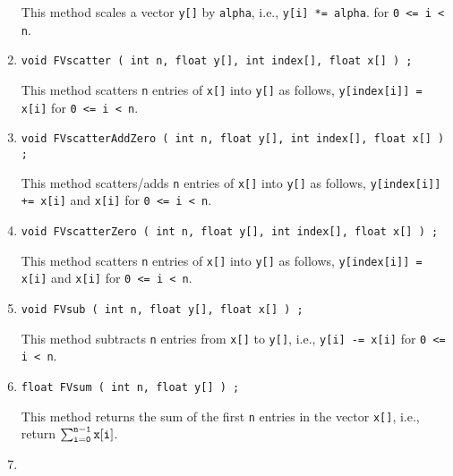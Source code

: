\begin{enumerate}
\begin{verbatim}
\end{verbatim}
This method scales a vector {\tt y[]} by {\tt alpha},
i.e.,
{\tt y[i] *= alpha}.
for {\tt 0 <= i < n}.
\item
\begin{verbatim}
void FVscatter ( int n, float y[], int index[], float x[] ) ;
\end{verbatim}
This method scatters {\tt n} entries of {\tt x[]} into {\tt y[]} 
as follows,
{\tt y[index[i]] = x[i]} 
for {\tt 0 <= i < n}.
\item
\begin{verbatim}
void FVscatterAddZero ( int n, float y[], int index[], float x[] ) ;
\end{verbatim}
This method scatters/adds {\tt n} entries of {\tt x[]} into {\tt y[]} 
as follows,
{\tt y[index[i]] += x[i]} and {\tt x[i]} 
for {\tt 0 <= i < n}.
\item
\begin{verbatim}
void FVscatterZero ( int n, float y[], int index[], float x[] ) ;
\end{verbatim}
This method scatters {\tt n} entries of {\tt x[]} into {\tt y[]} 
as follows,
{\tt y[index[i]] = x[i]} and {\tt x[i]} 
for {\tt 0 <= i < n}.
\item
\begin{verbatim}
void FVsub ( int n, float y[], float x[] ) ;
\end{verbatim}
This method subtracts {\tt n} entries from {\tt x[]} to {\tt y[]},
i.e.,
{\tt y[i] -= x[i]}
for {\tt 0 <= i < n}.
\item
\begin{verbatim}
float FVsum ( int n, float y[] ) ;
\end{verbatim}
This method returns the sum of the first {\tt n} entries 
in the vector {\tt x[]},
i.e., return
$\sum_{\tt i = 0}^{\tt n-1} {\tt x[i]}$.
\item
\begin{verbatim}

\end{verbatim}
\end{enumerate}
